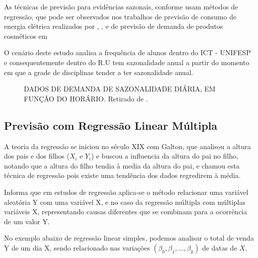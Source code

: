 \documentclass[	12pt, Times, openright, twoside, a4paper, english, brazil]{abntex2}
\begin{document}
          As técnicas de previsão para evidências sazonais, conforme  usam métodos de regressão, que pode ser observados nos trabalhos de previsão de consumo de energia elétrica realizados por \cite{Almeida2013}, \cite{RUAS2012}, \cite{Silva2010} e de previsão de demanda de produtos cosméticos em \cite{Junior2007}

          O cenário deste estudo analisa a frequência de alunos dentro do ICT - UNIFESP e consequentemente dentro do R.U tem sazonalidade anual a partir do momento em que a grade de disciplinas tender a ter sazonalidade anual. \\

          \begin{figure}[!ht]
          	\caption{DADOS DE DEMANDA DE SAZONALIDADE DIÁRIA, EM FUNÇÃO DO HORÁRIO. Retirado de \cite{RUAS2012}.\label{fig:seriesTemporais}}
          \end{figure}

        \subsection{Previsão com Regressão Linear Múltipla}
          A teoria da regressão se iniciou no século XIX com Galton, que analisou a altura dos pais e dos filhos ($X_i$ e $Y_i$) e buscou a influencia da altura do pai no filho, notando que a altura do filho tendia à media da altura do pai, e chamou esta técnica de regressão pois existe uma tendência dos dados regredirem à média.

          \cite{Clarice2011} Informa que em estudos de regressão aplica-se o método relacionar uma variável aleatória Y com uma variável X, e no caso da regressão múltipla com múltiplas variáveis X, representando causas diferentes que se combinam para a ocorrência de um valor Y. 

          No exemplo abaixo de regressão linear simples, podemos analisar o total de venda Y de um dia X, sendo relacionado nas variações $(\beta_0, \beta_1, ..., \beta_k)$ de datas de $X$.
\end{document}
